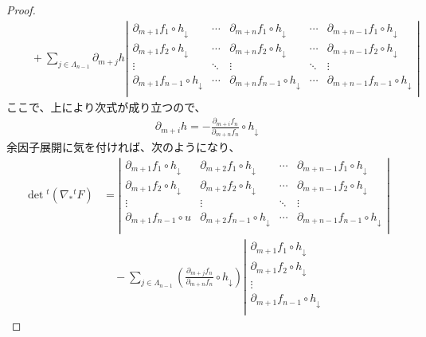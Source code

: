 \documentclass[dvipdfmx]{jsarticle}
\begin{document}
\begin{proof}
\begin{align*}
&\quad + \sum_{j \in \varLambda_{n - 1}} {\partial_{m + j}h\left| \begin{matrix}
\partial_{m + 1}f_{1} \circ h_{\downarrow} & \cdots & \partial_{m + n}f_{1} \circ h_{\downarrow} & \cdots & \partial_{m + n - 1}f_{1} \circ h_{\downarrow} \\
\partial_{m + 1}f_{2} \circ h_{\downarrow} & \cdots & \partial_{m + n}f_{2} \circ h_{\downarrow} & \cdots & \partial_{m + n - 1}f_{2} \circ h_{\downarrow} \\
 \vdots & \ddots & \vdots & \ddots & \vdots \\
\partial_{m + 1}f_{n - 1} \circ h_{\downarrow} & \cdots & \partial_{m + n}f_{n - 1} \circ h_{\downarrow} & \cdots & \partial_{m + n - 1}f_{n - 1} \circ h_{\downarrow} \\
\end{matrix} \right|}
\end{align*}
ここで、上により次式が成り立つので、
\begin{align*}
\partial_{m + i}h = - \frac{\partial_{m + i}f_{n}}{\partial_{m + n}f_{n}} \circ h_{\downarrow}
\end{align*}
余因子展開に気を付ければ、次のようになり、
\begin{align*}
\det{{}^{t}\left( \nabla_{*}{}^{t}F \right)} &=
\left| 
  \begin{matrix}
    \partial_{m + 1}f_{1} \circ h_{\downarrow} & \partial_{m + 2}f_{1} \circ h_{\downarrow} & \cdots & \partial_{m + n - 1}f_{1} \circ h_{\downarrow} \\
    \partial_{m + 1}f_{2} \circ h_{\downarrow} & \partial_{m + 2}f_{2} \circ h_{\downarrow} & \cdots & \partial_{m + n - 1}f_{2} \circ h_{\downarrow} \\
    \vdots & \vdots & \ddots & \vdots \\
    \partial_{m + 1}f_{n - 1} \circ u & \partial_{m + 2}f_{n - 1} \circ h_{\downarrow} & \cdots & \partial_{m + n - 1}f_{n - 1} \circ h_{\downarrow} \\
  \end{matrix} 
\right| \\
&\quad - \sum_{j \in \varLambda_{n - 1}} \left( \frac{\partial_{m + j}f_{n}}{\partial_{m + n}f_{n}} \circ h_{\downarrow} \right)
\left| 
  \begin{matrix}
    \partial_{m + 1}f_{1} \circ h_{\downarrow} \\
    \partial_{m + 1}f_{2} \circ h_{\downarrow} \\
    \vdots \\
    \partial_{m + 1}f_{n - 1} \circ h_{\downarrow} \\

\end{matrix}
\end{align*}
\end{proof}
\end{document}
